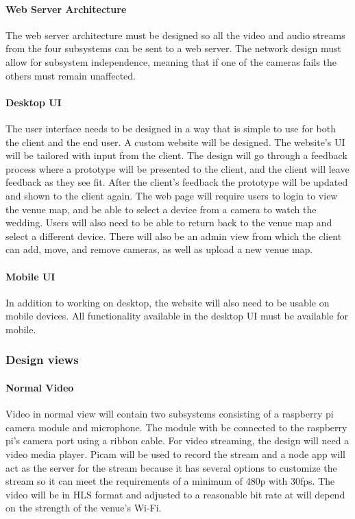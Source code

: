 \documentclass[onecolumn, draftclsnofoot,10pt, compsoc]{IEEEtran}
\begin{document}
        \paragraph{Web Server Architecture}
        The web server architecture must be designed so all the video and audio streams from the four subsystems can be sent to a web server. 
        The network design must allow for subsystem independence, meaning that if one of the cameras fails the others must remain unaffected.  
        
        \paragraph{Desktop UI}
        The user interface needs to be designed in a way that is simple to use for both the client and the end user. 
        A custom website will be designed. The website's UI will be tailored with input from the client.  
        The design will go through a feedback process where a prototype will be presented to the client, and the client will leave feedback as they see fit. 
        After the client's feedback the prototype will be updated and shown to the client again. 
        The web page will require users to login to view the venue map, and be able to select a device from a camera to watch the wedding. 
        Users will also need to be able to return back to the venue map and select a different device. 
        There will also be an admin view from which the client can add, move, and remove cameras, as well as upload a new venue map.
        
        \paragraph{Mobile UI}
        In addition to working on desktop, the website will also need to be usable on mobile devices. 
        All functionality available in the desktop UI must be available for mobile.
        
    \subsubsection{Design views}
        \paragraph{Normal Video}
        Video in normal view will contain two subsystems consisting of a raspberry pi camera module and microphone. 
        The module with be connected to the raspberry pi's camera port using a ribbon cable. 
        For video streaming, the design will need a video media player. 
        Picam will be used to record the stream and a node app will act as the server for the stream because it has several options to customize the stream so it can meet the requirements of a minimum of 480p with 30fps. 
        The video will be in HLS format and adjusted to a reasonable bit rate at will depend on the strength of the venue's Wi-Fi. 
        
\end{document}
